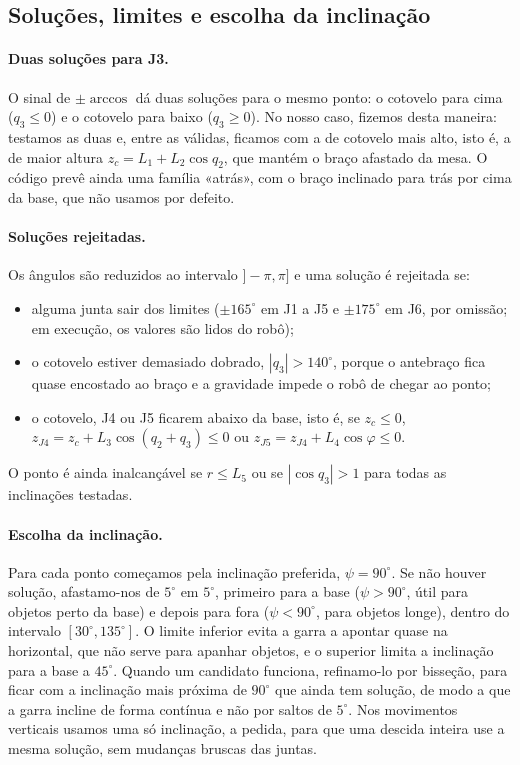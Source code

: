 \subsection{Soluções, limites e escolha da inclinação}

\paragraph{Duas soluções para J3.} O sinal de $\pm\arccos$ dá duas soluções para o mesmo ponto: o cotovelo para cima ($q_3\le 0$) e o cotovelo para baixo ($q_3\ge 0$). No nosso caso, fizemos desta maneira: testamos as duas e, entre as válidas, ficamos com a de cotovelo mais alto, isto é, a de maior altura $z_{c}=L_1+L_2\cos q_2$, que mantém o braço afastado da mesa. O código prevê ainda uma família «atrás», com o braço inclinado para trás por cima da base, que não usamos por defeito.

\paragraph{Soluções rejeitadas.} Os ângulos são reduzidos ao intervalo $]-\pi,\pi]$ e uma solução é rejeitada se:
\begin{itemize}
  \item alguma junta sair dos limites ($\pm165^\circ$ em J1 a J5 e $\pm175^\circ$ em J6, por omissão; em execução, os valores são lidos do robô);
  \item o cotovelo estiver demasiado dobrado, $|q_3|>140^\circ$, porque o antebraço fica quase encostado ao braço e a gravidade impede o robô de chegar ao ponto;
  \item o cotovelo, J4 ou J5 ficarem abaixo da base, isto é, se $z_c\le 0$, $z_{J4}=z_c+L_3\cos(q_2+q_3)\le 0$ ou $z_{J5}=z_{J4}+L_4\cos\varphi\le 0$.
\end{itemize}
O ponto é ainda inalcançável se $r\le L_5$ ou se $|\cos q_3|>1$ para todas as inclinações testadas.

\paragraph{Escolha da inclinação.} Para cada ponto começamos pela inclinação preferida, $\psi=90^\circ$. Se não houver solução, afastamo-nos de $5^\circ$ em $5^\circ$, primeiro para a base ($\psi>90^\circ$, útil para objetos perto da base) e depois para fora ($\psi<90^\circ$, para objetos longe), dentro do intervalo $[30^\circ,135^\circ]$. O limite inferior evita a garra a apontar quase na horizontal, que não serve para apanhar objetos, e o superior limita a inclinação para a base a $45^\circ$. Quando um candidato funciona, refinamo-lo por bisseção, para ficar com a inclinação mais próxima de $90^\circ$ que ainda tem solução, de modo a que a garra incline de forma contínua e não por saltos de $5^\circ$. Nos movimentos verticais usamos uma só inclinação, a pedida, para que uma descida inteira use a mesma solução, sem mudanças bruscas das juntas.

